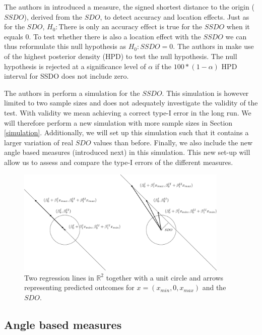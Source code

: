 \documentclass[]{interact}
\begin{document}
The authors in \cite{CremersMulderKlugkist2017} introduced a measure, the signed shortest distance to
the origin ($SSDO$), derived from the $SDO$, to detect accuracy and location
effects. Just as for the $SDO$, \textit{$H_0: \text{There is only an
accuracy effect}$} is true for the $SSDO$ when it equals 0. To test whether
there is also a location effect with the $SSDO$ we can thus reformulate this
null hypothesis as \textit{$H_0: SSDO = 0$}. The authors in
\cite{CremersMulderKlugkist2017} make use of the highest posterior density (HPD) to
test the null hypothesis. The null hypothesis is rejected at a significance
level of $\alpha$ if the $100*(1-\alpha)$ HPD interval
for SSDO does not include zero.

The authors in \cite{CremersMulderKlugkist2017} perform a simulation for the $SSDO$. This simulation
  is however limited to two sample sizes and does not adequately investigate the
  validity of the test. With validity we mean achieving a correct type-I error
  in the long run. We will therefore  perform a new simulation with more sample
  sizes in Section \ref{simulation}. Additionally, we will set up this
  simulation such that it contains a larger variation of real $SDO$ values than
  before. Finally, we also include the new angle based measures (introduced
  next) in this simulation. This new set-up will allow us to assess and compare
  the type-I errors of the different measures.

\begin{figure}
\centering
\includegraphics[width = 0.9\textwidth]{LocAcc.pdf}
\caption{Two regression lines in $\mathbb{R}^2$ together with a unit circle and arrows representing predicted outcomes for $x = (x_{min}, 0, x_{max})$ and the $SDO$.} 
\label{figLocAcc}
\end{figure}


\subsection{Angle based measures}\label{measure2}
\end{document}

